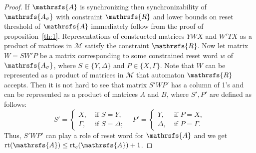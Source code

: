 \documentclass[11pt]{llncs}
\newcommand{\A}{\mathrsfs{A}}
\newcommand{\R}{\mathrsfs{R}}
\newcommand{\AD}{\mathrsfs{A_{\sigma}}}
\newcommand{\G}{\Gamma}
\newcommand{\D}{\Delta}
\newcommand{\rt}{\mathrm{rt}}
\newcommand{\rtc}{\mathrm{rt}_{c}}
\begin{document}
\begin{proof}
If $\A$ is synchronizing then synchronizability of $\AD$ with constraint $\R$ and lower bounds on reset threshold of $\A$ immediately 
follow from the proof of proposition~\ref{th:1}.
Representations of constructed matrices $YWX$ and $W'TX$ as a product of matrices in $\mathcal{M}$ satisfy the
constraint $\R$.
Now let matrix $W = SW'P$ be a matrix corresponding to some constrained reset word $w$ of $\AD$, where $S \in \{Y, \D\}$
and $P \in \{ X, \G\}$. Note that $W$ can be represented as a product of matrices in $\mathcal{M}$ that automaton $\R$ 
accepts.
Then it is not hard to see that matrix $S'WP'$ has a column of 1's and can be represented as
a product of matrices $A$ and $B$, where $S',P'$ are defined as follows:
$$
S' = 
\begin{cases}
X,\;& \mbox{if } S = Y,\\
\G,\;& \mbox{if } S = \D;
\end{cases}\;\;\;
P' = 
\begin{cases}
Y,\;& \mbox{if } P = X,\\
\D,\;& \mbox{if } P = \G.
\end{cases}
$$
Thus, $S'WP'$ can play a role of reset word for $\A$ and we get $\rt(\A) \leq \rtc(\A) + 1$.
\end{proof}
\end{document}
